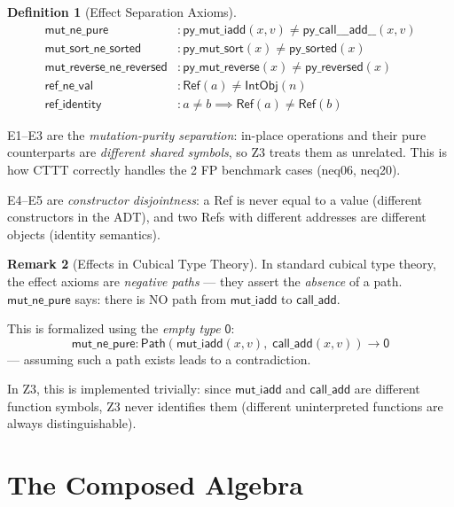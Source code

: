 \documentclass[11pt,a4paper]{report}
\theoremstyle{definition}
\newtheorem{definition}{Definition}[chapter]
\newtheorem{remark}[definition]{Remark}
\theoremstyle{plain}
\newcommand{\Path}{\mathsf{Path}}
\begin{document}
\begin{definition}[Effect Separation Axioms]
\begin{align}
  \mathsf{mut\_ne\_pure} &:
    \mathsf{py\_mut\_iadd}(x, v) \neq
    \mathsf{py\_call\_\_\_add\_\_}(x, v)
    \tag{E1} \\
  \mathsf{mut\_sort\_ne\_sorted} &:
    \mathsf{py\_mut\_sort}(x) \neq \mathsf{py\_sorted}(x)
    \tag{E2} \\
  \mathsf{mut\_reverse\_ne\_reversed} &:
    \mathsf{py\_mut\_reverse}(x) \neq \mathsf{py\_reversed}(x)
    \tag{E3} \\
  \mathsf{ref\_ne\_val} &:
    \mathsf{Ref}(a) \neq \mathsf{IntObj}(n)
    \tag{E4} \\
  \mathsf{ref\_identity} &:
    a \neq b \implies \mathsf{Ref}(a) \neq \mathsf{Ref}(b)
    \tag{E5}
\end{align}
\end{definition}

E1--E3 are the \emph{mutation-purity separation}: in-place operations
and their pure counterparts are \emph{different shared symbols}, so
Z3 treats them as unrelated.  This is how CTTT correctly handles
the 2 FP benchmark cases (neq06, neq20).

E4--E5 are \emph{constructor disjointness}: a Ref is never equal to
a value (different constructors in the ADT), and two Refs with
different addresses are different objects (identity semantics).

\begin{remark}[Effects in Cubical Type Theory]
In standard cubical type theory, the effect axioms are
\emph{negative paths} --- they assert the \emph{absence} of a path.
$\mathsf{mut\_ne\_pure}$ says: there is NO path from
$\mathsf{mut\_iadd}$ to $\mathsf{call\_add}$.

This is formalized using the \emph{empty type} $\mathsf{0}$:
\[
  \mathsf{mut\_ne\_pure} : \Path(\mathsf{mut\_iadd}(x,v),\;
    \mathsf{call\_add}(x,v)) \to \mathsf{0}
\]
--- assuming such a path exists leads to a contradiction.

In Z3, this is implemented trivially: since $\mathsf{mut\_iadd}$ and
$\mathsf{call\_add}$ are different function symbols, Z3 never
identifies them (different uninterpreted functions are always
distinguishable).
\end{remark}


\section{The Composed Algebra}
\end{document}
